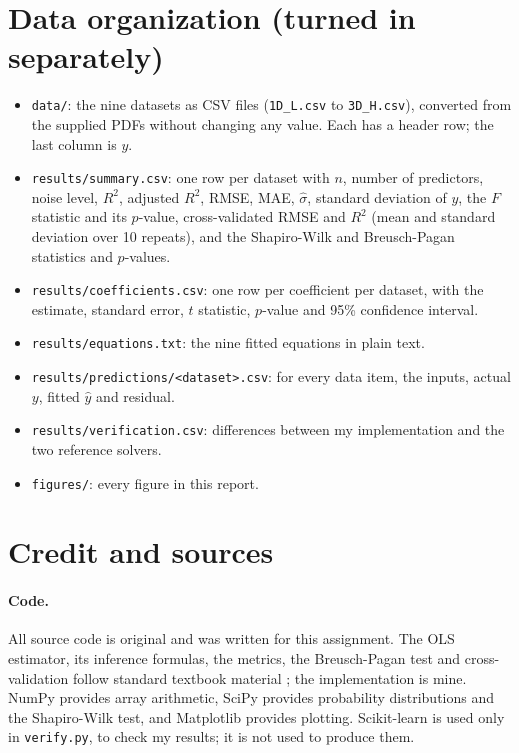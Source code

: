 \documentclass[11pt]{article}
\begin{document}
\section{Data organization (turned in separately)}

\begin{itemize}[leftmargin=1.4em]
\item \texttt{data/}: the nine datasets as CSV files (\texttt{1D\_L.csv} to \texttt{3D\_H.csv}), converted from the supplied PDFs without changing any value. Each has a header row; the last column is $y$.
\item \texttt{results/summary.csv}: one row per dataset with $n$, number of predictors, noise level, $R^2$, adjusted $R^2$, RMSE, MAE, $\hat\sigma$, standard deviation of $y$, the $F$ statistic and its $p$-value, cross-validated RMSE and $R^2$ (mean and standard deviation over 10 repeats), and the Shapiro-Wilk and Breusch-Pagan statistics and $p$-values.
\item \texttt{results/coefficients.csv}: one row per coefficient per dataset, with the estimate, standard error, $t$ statistic, $p$-value and 95\% confidence interval.
\item \texttt{results/equations.txt}: the nine fitted equations in plain text.
\item \texttt{results/predictions/<dataset>.csv}: for every data item, the inputs, actual $y$, fitted $\hat y$ and residual.
\item \texttt{results/verification.csv}: differences between my implementation and the two reference solvers.
\item \texttt{figures/}: every figure in this report.
\end{itemize}

\section{Credit and sources}

\paragraph{Code.} All source code is original and was written for this assignment. The OLS estimator, its inference formulas, the metrics, the Breusch-Pagan test and cross-validation follow standard textbook material \cite{islr}; the implementation is mine. NumPy provides array arithmetic, SciPy provides probability distributions and the Shapiro-Wilk test, and Matplotlib provides plotting. Scikit-learn is used only in \texttt{verify.py}, to check my results; it is not used to produce them.
\end{document}
